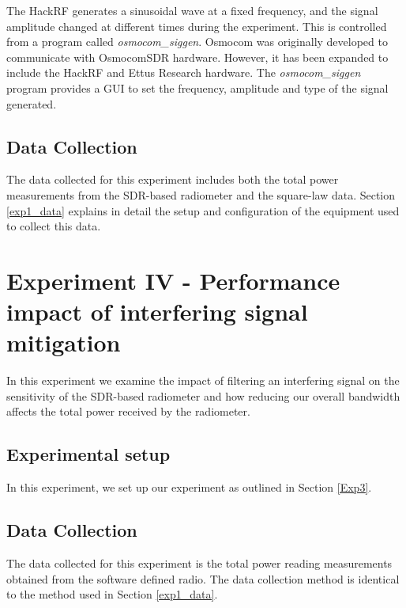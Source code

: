 The HackRF generates a sinusoidal wave at a fixed frequency, and the signal amplitude changed at different times during the experiment.  This is controlled from a program called \emph{osmocom\_siggen}.  Osmocom was originally developed to communicate with OsmocomSDR hardware.  However, it has been expanded to include the HackRF and Ettus Research hardware.  The \emph{osmocom\_siggen} program provides a GUI to set the frequency, amplitude and type of the signal generated.  

\subsection{Data Collection}

The data collected for this experiment includes both the total power measurements from the SDR-based radiometer and the square-law data.  Section \ref{exp1_data} explains in detail the setup and configuration of the equipment used to collect this data.

\section{Experiment IV - Performance impact of interfering signal mitigation}\label{Exp4}

In this experiment we examine the impact of filtering an interfering signal on the sensitivity of the SDR-based radiometer and how reducing our overall bandwidth affects the total power received by the radiometer.

\subsection{Experimental setup} \label{exp4_setup}

In this experiment, we set up our experiment as outlined in Section \ref{Exp3}.

\subsection{Data Collection}

The data collected for this experiment is the total power reading measurements obtained from the software defined radio.  The data collection method is identical to the method used in Section \ref{exp1_data}.

